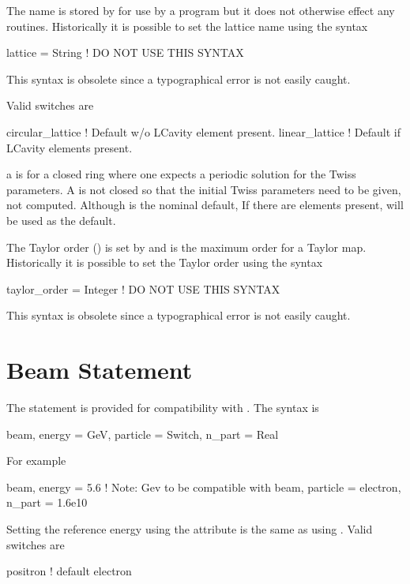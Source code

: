 The  name is stored by \bmad for use by a program but it does
not otherwise effect any \bmad routines. 
Historically it is possible to set the lattice name using the syntax
\begin{example}
  lattice = String   ! DO NOT USE THIS SYNTAX
\end{example}
This syntax is obsolete since a typographical error is not easily caught.

\noindent
Valid  switches are
\begin{example}
  circular_lattice  ! Default w/o LCavity element present.
  linear_lattice     ! Default if LCavity elements present.
\end{example}
a  is for a closed ring where one expects a
periodic solution for the Twiss parameters. A  is
not closed so that the initial Twiss parameters need to be given, not
computed. Although  is the nominal default, If
there are  elements present,  will be used
as the default.

The Taylor order () is set by
 and is the maximum order for a Taylor map.
Historically it is possible to set the Taylor order using the syntax
\begin{example}
  taylor_order = Integer   ! DO NOT USE THIS SYNTAX
\end{example}
This syntax is obsolete since a typographical error is not easily caught.

\section{Beam Statement}

The  statement is provided for compatibility with \MAD. The syntax is
\begin{example}
  beam, energy = GeV, particle = Switch, n_part = Real
\end{example}
For example
\begin{example}
  beam, energy = 5.6  ! Note: Gev to be compatible with \MAD
  beam, particle = electron, n_part = 1.6e10
\end{example}
Setting the reference energy using the  attribute is the same
as using . Valid 
switches are
\begin{example}
  positron  ! default
  electron
\end{example}

